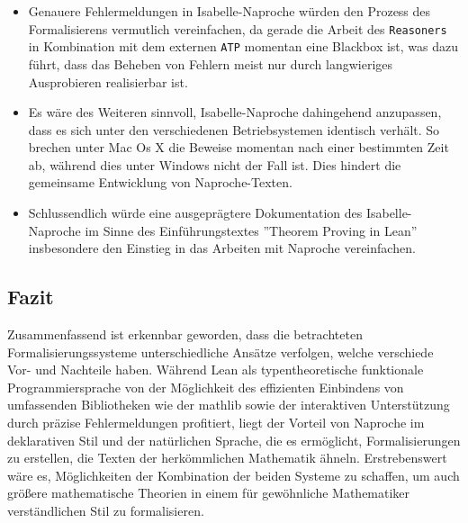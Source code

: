\documentclass[a4paper,12pt]{scrartcl}
\begin{document}
\begin{itemize}
\item Genauere Fehlermeldungen in Isabelle-Naproche würden den Prozess des Formalisierens vermutlich vereinfachen, da gerade die Arbeit des \verb!Reasoners! in Kombination mit dem externen \verb!ATP! momentan eine Blackbox ist, was dazu führt, dass das Beheben von Fehlern meist nur durch langwieriges Ausprobieren realisierbar ist.

\item Es wäre des Weiteren sinnvoll, Isabelle-Naproche dahingehend anzupassen, dass es sich unter den verschiedenen Betriebsystemen identisch verhält. So brechen unter Mac Os X die Beweise momentan nach einer bestimmten Zeit ab, während dies unter Windows nicht der Fall ist. Dies hindert die gemeinsame Entwicklung von Naproche-Texten.

\item Schlussendlich würde eine ausgeprägtere Dokumentation des Isabelle-Naproche im Sinne des Einführungstextes ''Theorem Proving in Lean'' \cite{bibtex.e} insbesondere den Einstieg in das Arbeiten mit Naproche vereinfachen.

\end{itemize}

\subsection{Fazit}

Zusammenfassend ist erkennbar geworden, dass die betrachteten Formalisierungssysteme unterschiedliche Ansätze verfolgen, welche verschiede Vor- und Nachteile haben. Während Lean als typentheoretische funktionale Programmiersprache von der Möglichkeit des effizienten Einbindens von umfassenden Bibliotheken wie der mathlib sowie der interaktiven Unterstützung durch präzise Fehlermeldungen profitiert,
liegt der Vorteil von Naproche im deklarativen Stil und der natürlichen Sprache, die es ermöglicht, Formalisierungen zu erstellen, die Texten der herkömmlichen Mathematik ähneln.
Erstrebenswert wäre es, Möglichkeiten der Kombination der beiden Systeme zu schaffen, um auch größere mathematische Theorien in einem für gewöhnliche Mathematiker verständlichen Stil zu formalisieren.

\newpage


\end{document}
